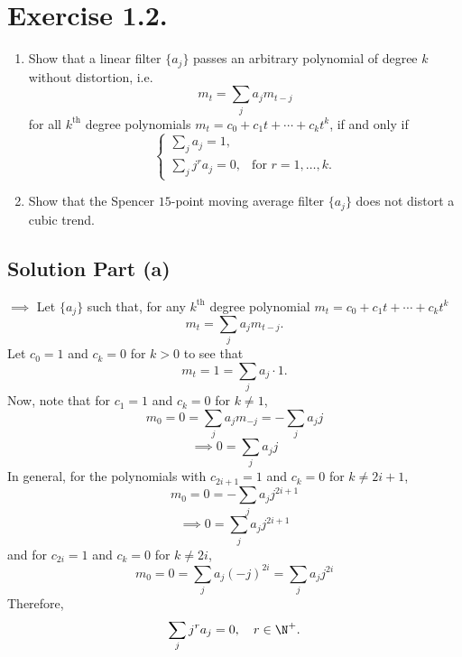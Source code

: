 \section*{Exercise 1.2.}

\begin{enumerate}[label = (\alph*)]
    \item Show that a linear filter $\{a_j\}$ passes an arbitrary polynomial of degree $k$ without distortion, i.e.
    \[ m_t = \sum_{j} a_j m_{t-j} \]
    for all $k^{\mbox{th}}$ degree polynomials $m_t = c_0 + c_1 t + \cdots + c_k t^k$, if and only if
    \[ \begin{cases}
        \sum_{j} a_j = 1,\\
        \sum_{j}j^r a_j = 0, & \mbox{for }r = 1,\ldots, k.
    \end{cases} \]
    \item Show that the Spencer $15$-point moving average filter $\{a_j\}$ does not distort a cubic trend.
\end{enumerate}

\subsection*{Solution Part (a)}

$\boldsymbol{\implies}$ Let $\{a_j\}$ such that, for any $k^{\mbox{th}}$ degree polynomial $m_t = c_0 + c_1 t + \cdots + c_k t^k$
\[ m_t = \sum_{j} a_j m_{t-j}. \]
Let $c_0 = 1$ and $c_k = 0$ for $k > 0$ to see that
\[ m_t = 1 = \sum_{j} a_j \cdot 1. \]
Now, note that for $c_1 = 1$ and $c_k = 0$ for $k\neq 1$,
\[ m_0 = 0 = \sum_{j} a_j m_{-j} = -\sum_{j} a_j j \]
\[ \implies 0 = \sum_{j} a_j j \]
In general, for the polynomials with $c_{2i+1} = 1$ and $c_k = 0$ for $k \neq 2i+1$,
\[ m_0 = 0 = -\sum_{j} a_j j^{2i+1} \]
\[  \implies 0 = \sum_{j} a_j j^{2i+1} \]
and for $c_{2i} = 1$ and $c_k = 0$ for $k \neq 2i$,
\[ m_0 = 0 = \sum_{j} a_j (- j)^{2i} = \sum_{j} a_j j^{2i} \]
Therefore,
\[ \sum_{j}j^r a_j = 0,\hspace{1em} r \in \N^+. \]

